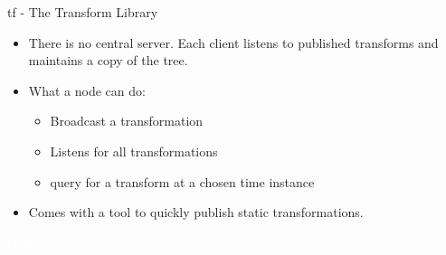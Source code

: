 \documentclass{beamer}
\begin{document}
\begin{frame}{tf - The Transform Library} 
	\subtitle{Coordinate Frames}

	\begin{itemize}
		\item There is no central server. Each client listens to published transforms and maintains a copy of the tree.
		\vspace{0.5cm}
		\item What a node can do:
		\begin{itemize}
			\item Broadcast a transformation
			\item Listens for all transformations
			\item query for a transform at a chosen time instance
		\end{itemize} 
		\vspace{0.5cm}
		\item Comes with a tool to quickly publish static transformations.
	\end{itemize}
\end{frame}

\begin{frame}[plain]{}  
	\centering
	{\huge \textcolor{white}{Demo} }
\end{frame}
\end{document}
